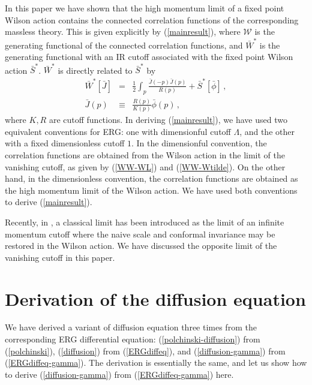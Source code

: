 \documentclass[aps,prd,preprint,groupedaddress,preprintnumbers,longbibliography]{revtex4-1}
\newcommand{\WW}{\mathcal{W}}
\begin{document}
In this paper we have shown that the high momentum limit of a fixed
point Wilson action contains the connected correlation functions of
the corresponding massless theory.  This is given explicitly by
(\ref{mainresult}), where $\WW$ is the generating functional of the
connected correlation functions, and $\bar{W}^*$ is the generating
functional with an IR cutoff associated with the fixed point Wilson
action $\bar{S}^*$.  $\bar{W}^*$ is directly related to $\bar{S}^*$ by
\begin{subequations}
\begin{eqnarray}
\bar{W}^* [\bar{J}] &=& \frac{1}{2} \int_p \frac{\bar{J} (-p) \bar{J}
  (p)}{R(p)} + \bar{S}^* [\bar{\phi}] \,,\\
\bar{J} (p) &\equiv& \frac{R (p)}{K(p)} \bar{\phi} (p)\,,
\end{eqnarray}
\end{subequations}
where $K, R$ are cutoff functions.  In deriving (\ref{mainresult}), we
have used two equivalent conventions for ERG: one with dimensionful
cutoff $\Lambda$, and the other with a fixed dimensionless cutoff $1$.
In the dimensionful convention, the correlation functions are obtained
from the Wilson action in the limit of the vanishing cutoff, as given
by (\ref{WW-WL}) and (\ref{WW-Wtilde}).  On the other hand, in the
dimensionless convention, the correlation functions are obtained as
the high momentum limit of the Wilson action.  We have used both
conventions to derive (\ref{mainresult}).

Recently, in \cite{Rosten:2017urs}, a classical limit has been introduced as the
limit of an infinite momentum cutoff where the naive scale and conformal
invariance may be restored in the Wilson action.  We have discussed the
opposite limit of the vanishing cutoff in this paper.



\appendix

\section{Derivation of the diffusion equation\label{appendix-diffusion}}

We have derived a variant of diffusion equation three times from the
corresponding ERG differential equation: (\ref{polchinski-diffusion})
from (\ref{polchinski}), (\ref{diffusion}) from (\ref{ERGdiffeq}), and
(\ref{diffusion-gamma}) from (\ref{ERGdiffeq-gamma}).  The derivation
is essentially the same, and let us show how to derive
(\ref{diffusion-gamma}) from (\ref{ERGdiffeq-gamma}) here.
\end{document}
